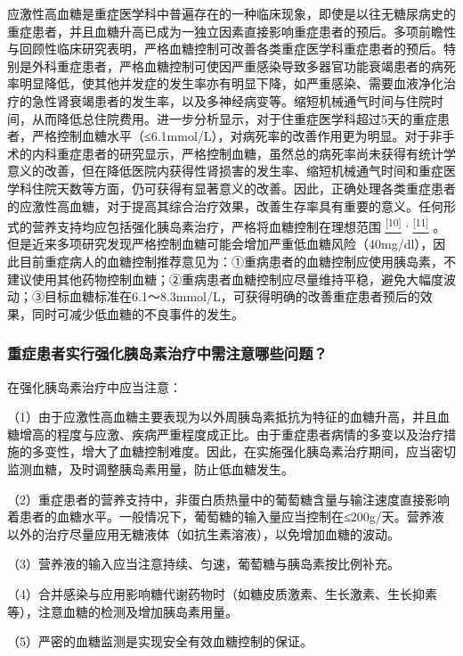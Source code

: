 应激性高血糖是重症医学科中普遍存在的一种临床现象，即使是以往无糖尿病史的重症患者，并且血糖升高已成为一独立因素直接影响重症患者的预后。多项前瞻性与回顾性临床研究表明，严格血糖控制可改善各类重症医学科重症患者的预后。特别是外科重症患者，严格血糖控制可使因严重感染导致多器官功能衰竭患者的病死率明显降低，使其他并发症的发生率亦有明显下降，如严重感染、需要血液净化治疗的急性肾衰竭患者的发生率，以及多神经病变等。缩短机械通气时间与住院时间，从而降低总住院费用。进一步分析显示，对于住重症医学科超过5天的重症患者，严格控制血糖水平（≤6.1mmol/L），对病死率的改善作用更为明显。对于非手术的内科重症患者的研究显示，严格控制血糖，虽然总的病死率尚未获得有统计学意义的改善，但在降低医院内获得性肾损害的发生率、缩短机械通气时间和重症医学科住院天数等方面，仍可获得有显著意义的改善。因此，正确处理各类重症患者的应激性高血糖，对于提高其综合治疗效果，改善生存率具有重要的意义。任何形式的营养支持均应包括强化胰岛素治疗，严格将血糖控制在理想范围
\protect\hyperlink{text00028.htmlux5cux23ch10-27}{\textsuperscript{{[}10{]}}}
\textsuperscript{,}
\protect\hyperlink{text00028.htmlux5cux23ch11-27}{\textsuperscript{{[}11{]}}}
。但是近来多项研究发现严格控制血糖可能会增加严重低血糖风险（40mg/dl），因此目前重症病人的血糖控制推荐意见为：①重病患者的血糖控制应使用胰岛素，不建议使用其他药物控制血糖；②重病患者血糖控制应尽量维持平稳，避免大幅度波动；③目标血糖标准在6.1～8.3mmol/L，可获得明确的改善重症患者预后的效果，同时可减少低血糖的不良事件的发生。

\subsubsection{重症患者实行强化胰岛素治疗中需注意哪些问题？}

在强化胰岛素治疗中应当注意：

（1）由于应激性高血糖主要表现为以外周胰岛素抵抗为特征的血糖升高，并且血糖增高的程度与应激、疾病严重程度成正比。由于重症患者病情的多变以及治疗措施的多变性，增大了血糖控制难度。因此，在实施强化胰岛素治疗期间，应当密切监测血糖，及时调整胰岛素用量，防止低血糖发生。

（2）重症患者的营养支持中，非蛋白质热量中的葡萄糖含量与输注速度直接影响着患者的血糖水平。一般情况下，葡萄糖的输入量应当控制在≤200g/天。营养液以外的治疗尽量应用无糖液体（如抗生素溶液），以免增加血糖的波动。

（3）营养液的输入应当注意持续、匀速，葡萄糖与胰岛素按比例补充。

（4）合并感染与应用影响糖代谢药物时（如糖皮质激素、生长激素、生长抑素等），注意血糖的检测及增加胰岛素用量。

（5）严密的血糖监测是实现安全有效血糖控制的保证。


